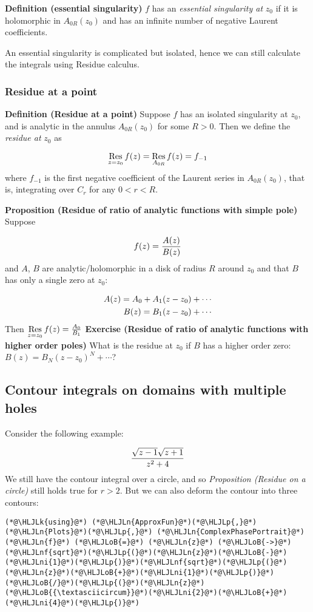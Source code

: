 \documentclass[12pt,landscape]{article}
\newcommand{\HLJLk}[1]{\textcolor[RGB]{148,91,176}{\textbf{#1}}}
\newcommand{\HLJLn}[1]{#1}
\newcommand{\HLJLnf}[1]{\textcolor[RGB]{66,102,213}{#1}}
\newcommand{\HLJLni}[1]{\textcolor[RGB]{59,151,46}{#1}}
\newcommand{\HLJLoB}[1]{\textcolor[RGB]{102,102,102}{\textbf{#1}}}
\newcommand{\HLJLp}[1]{#1}
\begin{document}
{\textbf{Definition (essential singularity)} $f$ has an \emph{essential singularity at} $z_0$ if it is holomorphic in $A_{0R}(z_0)$ and has an infinite number of negative Laurent coefficients.

An essential singularity is complicated but isolated, hence we can still calculate the integrals using Residue calculus.

\subsubsection{Residue at a point}
\textbf{Definition (Residue at a point)} Suppose $f$ has an isolated singularity at $z_0$, and is analytic in the annulus $A_{0R}(z_0)$ for some $R > 0$. Then we define the \emph{residue at} $z_0$ as

\[
{\underset{z = z_0}{\rm Res}}\, f(z) = {\underset{A_{0R}}{\rm Res}}\, f(z) = f_{-1}
\]
where $f_{-1}$ is the first negative coefficient of the Laurent series in $A_{0R}(z_0)$, that is, integrating over $C_r$ for any $0 < r < R$.

\textbf{Proposition (Residue of ratio of analytic functions with simple pole)} Suppose

\[
f(z) = {A(z) \over B(z)}
\]
and $A$, $B$ are analytic/holomorphic in a disk of radius $R$ around $z_0$ and that $B$ has only a single zero at $z_0$:


\begin{align*}
A(z) = A_0 + A_1(z-z_0) + \cdots \cr
B(z) = B_1(z-z_0) + \cdots
\end{align*}
Then ${\underset{z = z_0}{\rm Res}}\, f(z) = {A_0 \over B_1}$
\newpage
\textbf{Exercise (Residue of ratio of analytic functions with higher order  poles)} What is the residue at $z_0$ if $B$ has a higher order zero: $B(z) = B_N (z-z_0)^N + \cdots$?
\newpage
\subsection{Contour integrals on domains with multiple holes}
Consider the following example:

\[
    {\sqrt{z-1}\sqrt{z+1} \over z^2 + 4}
\]
We still have the contour integral over a circle, and so \emph{Proposition (Residue on a circle)} still holds true for $r > 2$. But we can also deform the contour into three contours:


\begin{lstlisting}
(*@\HLJLk{using}@*) (*@\HLJLn{ApproxFun}@*)(*@\HLJLp{,}@*) (*@\HLJLn{Plots}@*)(*@\HLJLp{,}@*) (*@\HLJLn{ComplexPhasePortrait}@*)
(*@\HLJLn{f}@*) (*@\HLJLoB{=}@*) (*@\HLJLn{z}@*) (*@\HLJLoB{->}@*) (*@\HLJLnf{sqrt}@*)(*@\HLJLp{(}@*)(*@\HLJLn{z}@*)(*@\HLJLoB{-}@*)(*@\HLJLni{1}@*)(*@\HLJLp{)}@*)(*@\HLJLnf{sqrt}@*)(*@\HLJLp{(}@*)(*@\HLJLn{z}@*)(*@\HLJLoB{+}@*)(*@\HLJLni{1}@*)(*@\HLJLp{)}@*)(*@\HLJLoB{/}@*)(*@\HLJLp{(}@*)(*@\HLJLn{z}@*)(*@\HLJLoB{{\textasciicircum}}@*)(*@\HLJLni{2}@*)(*@\HLJLoB{+}@*)(*@\HLJLni{4}@*)(*@\HLJLp{)}@*)


\end{lstlisting}}
\end{document}
